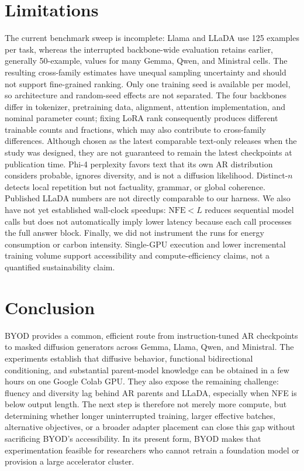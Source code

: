 \documentclass{article}
\newcommand{\method}{BYOD}
\begin{document}
\section{Limitations}

The current benchmark sweep is incomplete: Llama and LLaDA use 125 examples per task, whereas the interrupted backbone-wide evaluation retains earlier, generally 50-example, values for many Gemma, Qwen, and Ministral cells. The resulting cross-family estimates have unequal sampling uncertainty and should not support fine-grained ranking. Only one training seed is available per model, so architecture and random-seed effects are not separated. The four backbones differ in tokenizer, pretraining data, alignment, attention implementation, and nominal parameter count; fixing LoRA rank consequently produces different trainable counts and fractions, which may also contribute to cross-family differences. Although chosen as the latest comparable text-only releases when the study was designed, they are not guaranteed to remain the latest checkpoints at publication time. Phi-4 perplexity favors text that its own AR distribution considers probable, ignores diversity, and is not a diffusion likelihood. Distinct-$n$ detects local repetition but not factuality, grammar, or global coherence. Published LLaDA numbers are not directly comparable to our harness. We also have not yet established wall-clock speedups: $\mathrm{NFE}<L$ reduces sequential model calls but does not automatically imply lower latency because each call processes the full answer block. Finally, we did not instrument the runs for energy consumption or carbon intensity. Single-GPU execution and lower incremental training volume support accessibility and compute-efficiency claims, not a quantified sustainability claim.

\section{Conclusion}

\method{} provides a common, efficient route from instruction-tuned AR checkpoints to masked diffusion generators across Gemma, Llama, Qwen, and Ministral. The experiments establish that diffusive behavior, functional bidirectional conditioning, and substantial parent-model knowledge can be obtained in a few hours on one Google Colab GPU. They also expose the remaining challenge: fluency and diversity lag behind AR parents and LLaDA, especially when NFE is below output length. The next step is therefore not merely more compute, but determining whether longer uninterrupted training, larger effective batches, alternative objectives, or a broader adapter placement can close this gap without sacrificing BYOD's accessibility. In its present form, BYOD makes that experimentation feasible for researchers who cannot retrain a foundation model or provision a large accelerator cluster.
\end{document}
